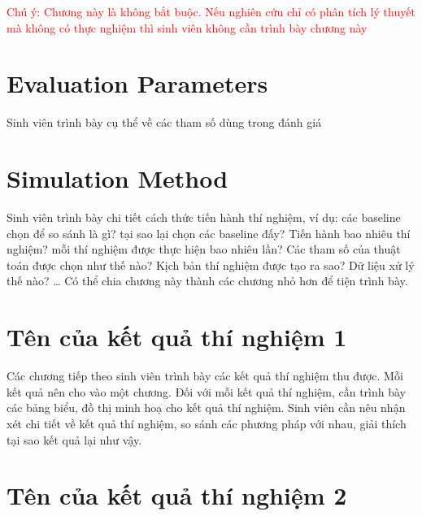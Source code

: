 \documentclass[../main.tex]{subfiles}
\begin{document}

\textcolor{red}{Chú ý: Chương này là không bắt buộc. Nếu nghiên cứu chỉ có phân tích lý thuyết mà không có thực nghiệm thì sinh viên không cần trình bày chương này }

\section{Evaluation Parameters}

Sinh viên trình bày cụ thể về các tham số dùng trong đánh giá 

\section{Simulation Method}

Sinh viên trình bày chi tiết cách thức tiến hành thí nghiệm, ví dụ: các baseline chọn để so sánh là gì? tại sao lại chọn các baseline đấy? Tiến hành bao nhiêu thí nghiệm? mỗi thí nghiệm được thực hiện bao nhiêu lần? Các tham số của thuật toán được chọn như thế nào? Kịch bản thí nghiệm được tạo ra sao? Dữ liệu xử lý thế nào? … Có thể chia  chương này thành các chương nhỏ hơn để tiện trình bày. 

\section{Tên của kết quả thí nghiệm 1}

Các chương tiếp theo sinh viên trình bày các kết quả thí nghiệm thu được. Mỗi kết quả nên cho vào một chương. Đối với mỗi kết quả thí nghiệm, cần trình bày các bảng biểu, đồ thị minh hoạ cho kết quả thí nghiệm. Sinh viên cần nêu nhận xét chi tiết về kết quả thí nghiệm, so sánh các phương pháp với nhau, giải thích tại sao kết quả lại như vậy. 

\section{Tên của kết quả thí nghiệm 2}
\end{document}
